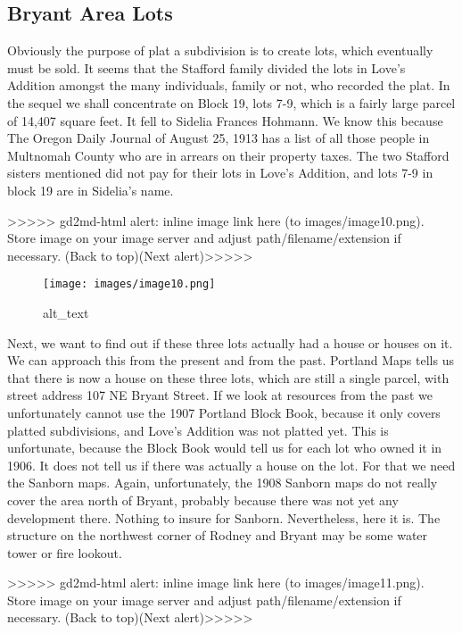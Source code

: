 \documentclass[
]{article}
\begin{document}
\hypertarget{bryant-area-lots}{%
\subsection{Bryant Area Lots}\label{bryant-area-lots}}

Obviously the purpose of plat a subdivision is to create lots, which
eventually must be sold. It seems that the Stafford family divided the
lots in Love's Addition amongst the many individuals, family or not, who
recorded the plat. In the sequel we shall concentrate on Block 19, lots
7-9, which is a fairly large parcel of 14,407 square feet. It fell to
Sidelia Frances Hohmann. We know this because The Oregon Daily Journal
of August 25, 1913 has a list of all those people in Multnomah County
who are in arrears on their property taxes. The two Stafford sisters
mentioned did not pay for their lots in Love's Addition, and lots 7-9 in
block 19 are in Sidelia's name.

{\textgreater\textgreater\textgreater\textgreater\textgreater{}
gd2md-html alert: inline image link here (to images/image10.png). Store
image on your image server and adjust path/filename/extension if
necessary. }(Back to top)(Next
alert){\textgreater\textgreater\textgreater\textgreater\textgreater{} }

\begin{figure}
\centering
\texttt{[image: images/image10.png]}
\caption{alt\_text}
\end{figure}

Next, we want to find out if these three lots actually had a house or
houses on it. We can approach this from the present and from the past.
Portland Maps tells us that there is now a house on these three lots,
which are still a single parcel, with street address 107 NE Bryant
Street. If we look at resources from the past we unfortunately cannot
use the 1907 Portland Block Book, because it only covers platted
subdivisions, and Love's Addition was not platted yet. This is
unfortunate, because the Block Book would tell us for each lot who owned
it in 1906. It does not tell us if there was actually a house on the
lot. For that we need the Sanborn maps. Again, unfortunately, the 1908
Sanborn maps do not really cover the area north of Bryant, probably
because there was not yet any development there. Nothing to insure for
Sanborn. Nevertheless, here it is. The structure on the northwest corner
of Rodney and Bryant may be some water tower or fire lookout.

{\textgreater\textgreater\textgreater\textgreater\textgreater{}
gd2md-html alert: inline image link here (to images/image11.png). Store
image on your image server and adjust path/filename/extension if
necessary. }(Back to top)(Next
alert){\textgreater\textgreater\textgreater\textgreater\textgreater{} }
\end{document}
